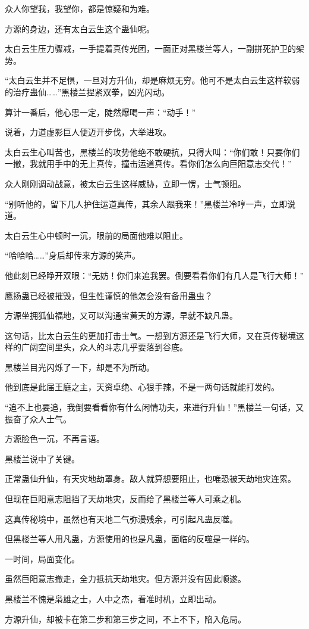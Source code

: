 \begin{this_body}
众人你望我，我望你，都是惊疑和为难。

方源的身边，还有太白云生这个蛊仙呢。

太白云生压力骤减，一手提着真传光团，一面正对黑楼兰等人，一副拼死护卫的架势。

“太白云生并不足惧，一旦对方升仙，却是麻烦无穷。他可不是太白云生这样软弱的治疗蛊仙……”黑楼兰捏紧双拳，凶光闪动。

算计一番后，他心思一定，陡然爆喝一声：“动手！”

说着，力道虚影巨人便迈开步伐，大举进攻。

太白云生心叫苦也，黑楼兰的攻势他绝不敢硬抗，只得大叫：“你们敢！只要你们一撤，我就用手中的无上真传，撞击运道真传。看你们怎么向巨阳意志交代！”

众人刚刚调动战意，被太白云生这样威胁，立即一愣，士气顿阻。

“别听他的，留下几人护住运道真传，其余人跟我来！”黑楼兰冷哼一声，立即说道。

太白云生心中顿时一沉，眼前的局面他难以阻止。

“哈哈哈……”身后却传来方源的笑声。

他此刻已经睁开双眼：“无妨！你们来追我罢。倒要看看你们有几人是飞行大师！”

鹰扬蛊已经被摧毁，但生性谨慎的他怎会没有备用蛊虫？

方源坐拥狐仙福地，又可以沟通宝黄天的方源，早就不缺凡蛊。

这句话，比太白云生的更加打击士气。一想到方源还是飞行大师，又在真传秘境这样的广阔空间里头，众人的斗志几乎要落到谷底。

黑楼兰目光闪烁了一下，却是不为所动。

他到底是此届王庭之主，天资卓绝、心狠手辣，不是一两句话就能打发的。

“追不上也要追，我倒要看看你有什么闲情功夫，来进行升仙！”黑楼兰一句话，又振奋了众人士气。

方源脸色一沉，不再言语。

黑楼兰说中了关键。

正常蛊仙升仙，有天灾地劫罩身。敌人就算想要阻止，也唯恐被天劫地灾连累。

但现在巨阳意志阻挡了天劫地灾，反而给了黑楼兰等人可乘之机。

这真传秘境中，虽然也有天地二气弥漫残余，可引起凡蛊反噬。

但黑楼兰等人用凡蛊，方源使用的也是凡蛊，面临的反噬是一样的。

一时间，局面变化。

虽然巨阳意志撤走，全力抵抗天劫地灾。但方源并没有因此顺遂。

黑楼兰不愧是枭雄之士，人中之杰，看准时机，立即出动。

方源升仙，却被卡在第二步和第三步之间，不上不下，陷入危局。

\end{this_body}

